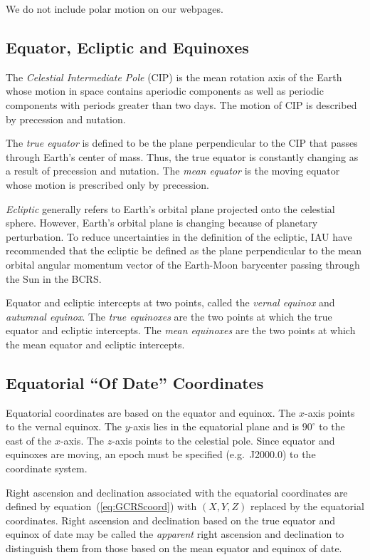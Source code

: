 \documentclass[12pt]{article}
\begin{document}
We do not include polar motion on our webpages.

\subsection{Equator, Ecliptic and Equinoxes}

The {\em Celestial Intermediate Pole} (CIP) is the mean rotation axis of the Earth 
whose motion in space contains aperiodic components as well as periodic 
components with periods greater than two days. The motion of CIP is described 
by precession and nutation.

The {\em true equator} is defined to be the plane perpendicular to the CIP 
that passes through Earth's center of mass. Thus, the true equator is constantly 
changing as a result of precession and nutation. The {\em mean equator} 
is the moving equator whose motion is prescribed only by precession. 

{\em Ecliptic} generally refers to Earth's orbital plane projected onto the 
celestial sphere. However, Earth's orbital plane is changing because of 
planetary perturbation. To reduce uncertainties in the definition of the 
ecliptic, IAU have recommended that the ecliptic be defined as the plane 
perpendicular to the mean orbital angular momentum vector of the Earth-Moon 
barycenter passing through the Sun in the BCRS.

Equator and ecliptic intercepts at two points, called the {\em vernal equinox} and 
{\em autumnal equinox}. The {\em true equinoxes} are the two points at which the true 
equator and ecliptic intercepts. The {\em mean equinoxes} are the two points 
at which the mean equator and ecliptic intercepts.

\subsection{Equatorial ``Of Date'' Coordinates} 

Equatorial coordinates are based on the equator and equinox. The $x$-axis 
points to the vernal equinox. The $y$-axis lies in the equatorial plane 
and is $90^\circ$ to the east of the $x$-axis. The $z$-axis points to 
the celestial pole. Since equator 
and equinoxes are moving, an epoch must be specified (e.g.\ J2000.0) to the coordinate 
system.  

Right ascension and declination associated with the equatorial coordinates 
are defined by equation~(\ref{eq:GCRScoord}) with $(X,Y,Z)$ replaced by the 
equatorial coordinates. Right ascension and declination based on the 
true equator and equinox of date may be called the {\em apparent} right ascension and 
declination to distinguish them from those based on the mean equator and 
equinox of date.
\end{document}
